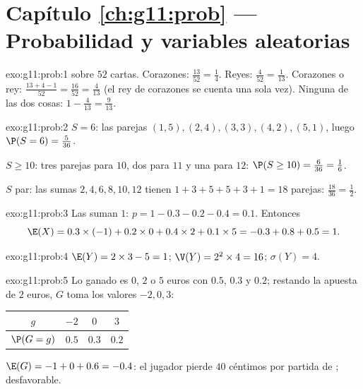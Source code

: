 \section*{Capítulo \ref{ch:g11:prob} --- Probabilidad y variables aleatorias}

\begin{solution}{exo:g11:prob:1}
 sobre $52$ cartas. Corazones: $\frac{13}{52} = \frac14$.
Reyes: $\frac{4}{52} = \frac{1}{13}$. Corazones o rey:
$\frac{13 + 4 - 1}{52} = \frac{16}{52} = \frac{4}{13}$ (el rey de
corazones se cuenta una sola vez). Ninguna de las dos cosas:
$1 - \frac{4}{13} = \frac{9}{13}$.
\end{solution}

\begin{solution}{exo:g11:prob:2}
$S = 6$: las parejas $(1,5), (2,4), (3,3), (4,2), (5,1)$, luego
$\P(S = 6) = \frac{5}{36}$.

$S \geq 10$: tres parejas para $10$, dos para $11$ y una para $12$:
$\P(S \geq 10) = \frac{6}{36} = \frac16$.

$S$ par: las sumas $2, 4, 6, 8, 10, 12$ tienen
$1 + 3 + 5 + 5 + 3 + 1 = 18$ parejas: 
$\frac{18}{36} = \frac12$.
\end{solution}

\begin{solution}{exo:g11:prob:3}
Las  suman $1$: $p = 1 - 0.3 - 0.2 - 0.4 = 0.1$. Entonces
\[
\E(X) = 0.3 \times (-1) + 0.2 \times 0 + 0.4 \times 2 + 0.1 \times 5
= -0.3 + 0.8 + 0.5 = 1 .
\]
\end{solution}

\begin{solution}{exo:g11:prob:4}
$\E(Y) = 2 \times 3 - 5 = 1$; $\V(Y) = 2^2 \times 4 = 16$;
$\sigma(Y) = 4$.
\end{solution}

\begin{solution}{exo:g11:prob:5}
Lo ganado es $0$, $2$ o $5$ euros con  $0.5$, $0.3$ y $0.2$;
restando la apuesta de $2$ euros, $G$ toma los valores $-2, 0, 3$:
\begin{center}
\begin{tabular}{c|ccc}
$g$ & $-2$ & $0$ & $3$\\
\hline
$\P(G=g)$ & $0.5$ & $0.3$ & $0.2$
\end{tabular}
\end{center}
$\E(G) = -1 + 0 + 0.6 = -0.4$: el jugador pierde $40$ céntimos por partida
de ; desfavorable.
\end{solution}

